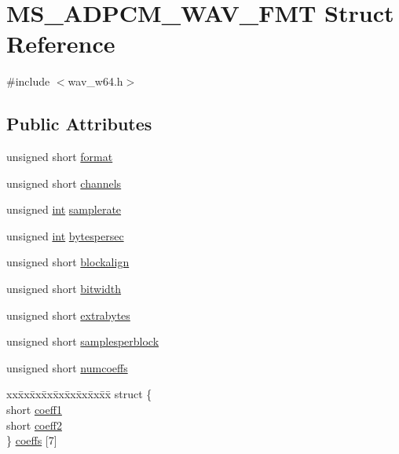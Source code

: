\hypertarget{struct_m_s___a_d_p_c_m___w_a_v___f_m_t}{}\section{M\+S\+\_\+\+A\+D\+P\+C\+M\+\_\+\+W\+A\+V\+\_\+\+F\+MT Struct Reference}
\label{struct_m_s___a_d_p_c_m___w_a_v___f_m_t}


{\ttfamily \#include $<$wav\+\_\+w64.\+h$>$}

\subsection*{Public Attributes}
\begin{DoxyCompactItemize}
\item 
unsigned short \hyperlink{struct_m_s___a_d_p_c_m___w_a_v___f_m_t_a8ad84a2316954e7a0d25d0a458f8fa7a}{format}
\item 
unsigned short \hyperlink{struct_m_s___a_d_p_c_m___w_a_v___f_m_t_ae1fcd6bb6ca7fa18123911b835f0db7e}{channels}
\item 
unsigned \hyperlink{xmltok_8h_a5a0d4a5641ce434f1d23533f2b2e6653}{int} \hyperlink{struct_m_s___a_d_p_c_m___w_a_v___f_m_t_af01bf395827355625f406b8f309710ce}{samplerate}
\item 
unsigned \hyperlink{xmltok_8h_a5a0d4a5641ce434f1d23533f2b2e6653}{int} \hyperlink{struct_m_s___a_d_p_c_m___w_a_v___f_m_t_a7d9c4e0e0f10df646f5a7e6c92a5d316}{bytespersec}
\item 
unsigned short \hyperlink{struct_m_s___a_d_p_c_m___w_a_v___f_m_t_a84706bebb3a76ea697ed43a02b3954ef}{blockalign}
\item 
unsigned short \hyperlink{struct_m_s___a_d_p_c_m___w_a_v___f_m_t_a3bfa4bc655ca1617daee5b8a395cd374}{bitwidth}
\item 
unsigned short \hyperlink{struct_m_s___a_d_p_c_m___w_a_v___f_m_t_a80a53e64014ab0229ea691734c9e6040}{extrabytes}
\item 
unsigned short \hyperlink{struct_m_s___a_d_p_c_m___w_a_v___f_m_t_a1a040efd063343056872073639ebb77c}{samplesperblock}
\item 
unsigned short \hyperlink{struct_m_s___a_d_p_c_m___w_a_v___f_m_t_abc4760b03c012bd5c4d0091e192a9cdd}{numcoeffs}
\item 
\begin{tabbing}
xx\=xx\=xx\=xx\=xx\=xx\=xx\=xx\=xx\=\kill
struct \{\\
\>short \hyperlink{struct_m_s___a_d_p_c_m___w_a_v___f_m_t_a8ce88ab3d02484a576b06d6c9aeccc4b}{coeff1}\\
\>short \hyperlink{struct_m_s___a_d_p_c_m___w_a_v___f_m_t_a96a05883a256312c0d491b543e79be30}{coeff2}\\
\} \hyperlink{struct_m_s___a_d_p_c_m___w_a_v___f_m_t_ab2927504c4f60f51b037e3f31f2691ff}{coeffs} \mbox{[}7\mbox{]}\\

\end{tabbing}\end{DoxyCompactItemize}


